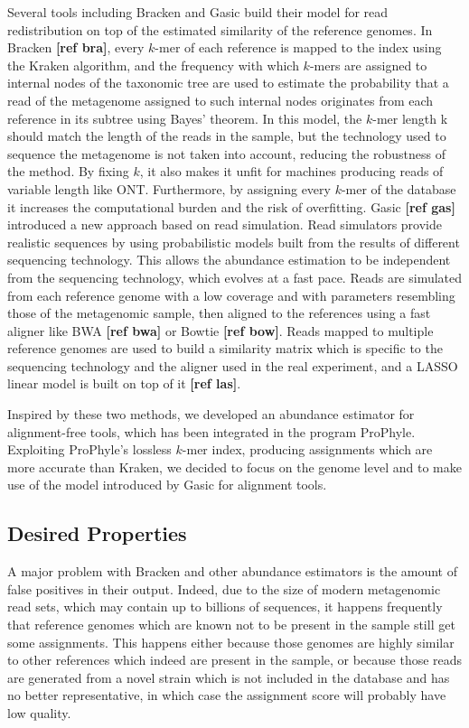 Several tools including Bracken and Gasic build their model for read redistribution on top of the estimated similarity of the reference genomes. In Bracken \textbf{[ref bra]}, every $k$-mer of each reference is mapped to the index using the Kraken algorithm, and the frequency with which $k$-mers are assigned to internal nodes of the taxonomic tree are used to estimate the probability that a read of the metagenome assigned to such internal nodes originates from each reference in its subtree using Bayes' theorem. In this model, the $k$-mer length k should match the length of the reads in the sample, but the technology used to sequence the metagenome is not taken into account, reducing the robustness of the method. By fixing $k$, it also makes it unfit for machines producing reads of variable length like ONT. Furthermore, by assigning every $k$-mer of the database it increases the computational burden and the risk of overfitting.
Gasic \textbf{[ref gas]} introduced a new approach based on read simulation. Read simulators provide realistic sequences by using probabilistic models built from the results of different sequencing technology. This allows the abundance estimation to be independent from the sequencing technology, which evolves at a fast pace. Reads are simulated from each reference genome with a low coverage and with parameters resembling those of the metagenomic sample, then aligned to the references using a fast aligner like BWA \textbf{[ref bwa]} or Bowtie \textbf{[ref bow]}. Reads mapped to multiple reference genomes are used to build a similarity matrix which is specific to the sequencing technology and the aligner used in the real experiment, and a LASSO linear model is built on top of it \textbf{[ref las]}.

Inspired by these two methods, we developed an abundance estimator for alignment-free tools, which has been integrated in the program ProPhyle. Exploiting ProPhyle's lossless $k$-mer index, producing assignments which are more accurate than Kraken, we decided to focus on the genome level and to make use of the model introduced by Gasic for alignment tools.

\subsection{Desired Properties}

A major problem with Bracken and other abundance estimators is the amount of false positives in their output. Indeed, due to the size of modern metagenomic read sets, which may contain up to billions of sequences, it happens frequently that reference genomes which are known not to be present in the sample still get some assignments. This happens either because those genomes are highly similar to other references which indeed are present in the sample, or because those reads are generated from a novel strain which is not included in the database and has no better representative, in which case the assignment score will probably have low quality.

